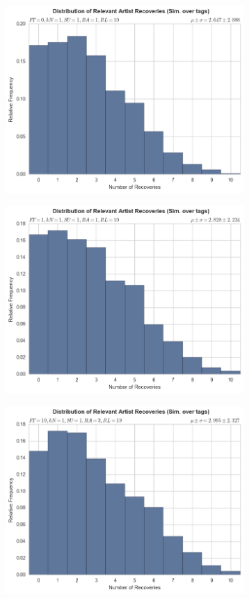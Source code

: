 \documentclass[12pt]{article}
\begin{document}
\begin{figure}[h!]
\centering
  \begin{subfigure}
      \centering
    \includegraphics[height=2.8in]{tags,FT=0,kN=1,SU=1,RA=1,RL=10.png}
  \end{subfigure}
  \begin{subfigure}
      \centering
    \includegraphics[height=2.8in]{tags,FT=1,kN=1,SU=1,RA=1,RL=10.png}
  \end{subfigure}
  \begin{subfigure}
      \centering
    \includegraphics[height=2.8in]{tags,FT=10,kN=1,SU=1,RA=3,RL=10.png}

\end{subfigure}
\end{figure}
\end{document}
